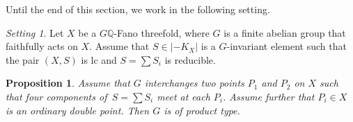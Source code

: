 \documentclass[11pt]{amsart}
\numberwithin{equation}{section}
\newtheorem{proposition}[thm]{Proposition}
\theoremstyle{definition}
\theoremstyle{remark}
\newtheorem{setting}[thm]{Setting} %
\begin{document}
Until the end of this section, we work in the following setting.  

\begin{setting}
Let $X$ be a $G\mathbb{Q}$-Fano threefold, where $G$ is a finite abelian group that faithfully acts on $X$. Assume that $S\in|-K_X|$ is a $G$-invariant element such that the pair $(X, S)$ is lc and $S=\sum S_i$ is reducible. 
\end{setting}


\begin{proposition}
\label{prop-lc-gorenstein-4comp}
Assume that $G$ interchanges two points $P_1$ and $P_2$ on $X$ such that four components of\, $S=\sum S_i$ meet at each $P_i$.  Assume further that $P_i\in X$ is an ordinary double point. Then $G$ is of product type.
\end{proposition}
\end{document}
